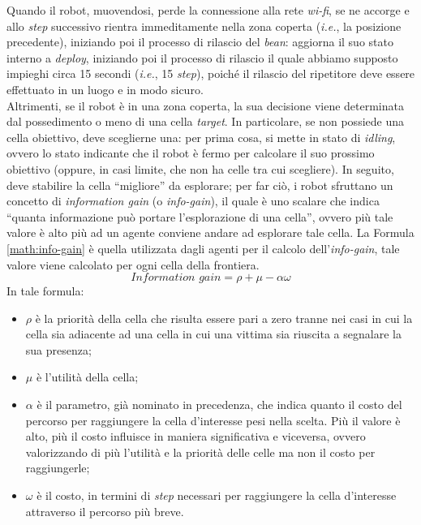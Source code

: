 Quando il robot, muovendosi, perde la connessione alla rete \textit{wi-fi}, se ne accorge e allo \textit{step} successivo rientra immeditamente nella zona coperta (\textit{i.e.}, la posizione precedente), iniziando poi il processo di rilascio del \textit{bean}: aggiorna il suo stato interno a \textit{deploy}, iniziando poi il processo di rilascio il quale abbiamo supposto impieghi circa 15 secondi (\textit{i.e.}, 15 \textit{step}), poiché il rilascio del ripetitore deve essere effettuato in un luogo e in modo sicuro.\\
Altrimenti, se il robot è in una zona coperta, la sua decisione viene determinata dal possedimento o meno di una cella \textit{target}.
In particolare, se non possiede una cella obiettivo, deve sceglierne una: per prima cosa, si mette in stato di \textit{idling}, ovvero lo stato indicante che il robot è fermo per calcolare il suo prossimo obiettivo (oppure, in casi limite, che non ha celle tra cui scegliere).
In seguito, deve stabilire la cella “migliore” da esplorare; per far ciò, i robot sfruttano un concetto di \textit{information gain} (o \textit{info-gain}),  il quale è uno scalare che indica “quanta informazione può portare l'esplorazione di una cella”, ovvero più tale valore è alto più ad un agente conviene andare ad esplorare tale cella.
La Formula \ref{math:info-gain} è quella utilizzata dagli agenti per il calcolo dell'\textit{info-gain}, tale valore viene calcolato per ogni cella della frontiera.
\begin{equation}
	\label{math:info-gain}
	\textit{Information gain} = \rho+\mu-\alpha\omega
\end{equation}
In tale formula:
\begin{itemize}
	\item $\rho$ è la priorità della cella che risulta essere pari a zero tranne nei casi in cui la cella sia adiacente ad una cella in cui una vittima sia riuscita a segnalare la sua presenza;
	\item $\mu$ è l'utilità della cella;
	\item $\alpha$ è il parametro, già nominato in precedenza, che indica quanto il costo del percorso per raggiungere la cella d'interesse pesi nella scelta. Più il valore è alto, più il costo influisce in maniera significativa e viceversa, ovvero valorizzando di più l'utilità e la priorità delle celle ma non il costo per raggiungerle;
	\item $\omega$ è il costo, in termini di \textit{step} necessari per raggiungere la cella d'interesse attraverso il percorso più breve. 
\end{itemize}
